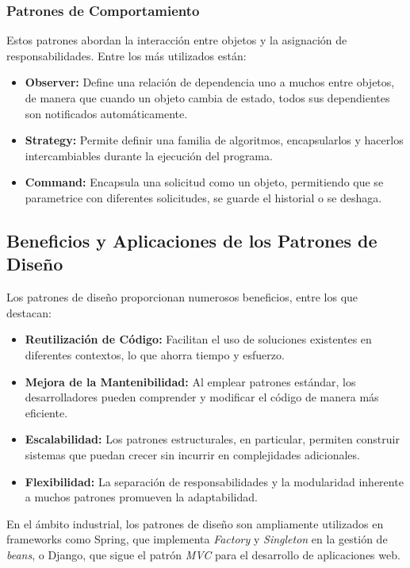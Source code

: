 \documentclass[12pt, a4paper]{article}
\begin{document}
\subsubsection{Patrones de Comportamiento}
Estos patrones abordan la interacción entre objetos y la asignación de responsabilidades. Entre los más utilizados están:
\begin{itemize}
    \item \textbf{Observer:} Define una relación de dependencia uno a muchos entre objetos, de manera que cuando un objeto cambia de estado, todos sus dependientes son notificados automáticamente.
    \item \textbf{Strategy:} Permite definir una familia de algoritmos, encapsularlos y hacerlos intercambiables durante la ejecución del programa.
    \item \textbf{Command:} Encapsula una solicitud como un objeto, permitiendo que se parametrice con diferentes solicitudes, se guarde el historial o se deshaga.
\end{itemize}

\subsection{Beneficios y Aplicaciones de los Patrones de Diseño}
Los patrones de diseño proporcionan numerosos beneficios, entre los que destacan:
\begin{itemize}
    \item \textbf{Reutilización de Código:} Facilitan el uso de soluciones existentes en diferentes contextos, lo que ahorra tiempo y esfuerzo.
    \item \textbf{Mejora de la Mantenibilidad:} Al emplear patrones estándar, los desarrolladores pueden comprender y modificar el código de manera más eficiente.
    \item \textbf{Escalabilidad:} Los patrones estructurales, en particular, permiten construir sistemas que puedan crecer sin incurrir en complejidades adicionales.
    \item \textbf{Flexibilidad:} La separación de responsabilidades y la modularidad inherente a muchos patrones promueven la adaptabilidad.
\end{itemize}

En el ámbito industrial, los patrones de diseño son ampliamente utilizados en frameworks como Spring, que implementa \textit{Factory} y \textit{Singleton} en la gestión de \textit{beans}, o Django, que sigue el patrón \textit{MVC} para el desarrollo de aplicaciones web.
\end{document}
